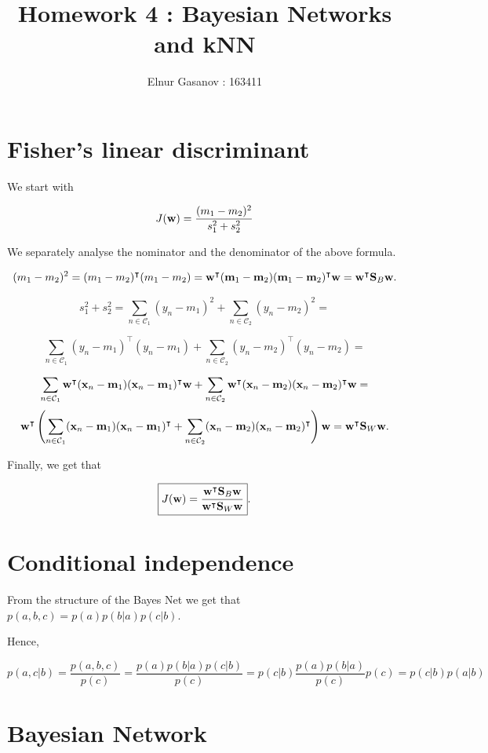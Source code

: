 \documentclass{article}
\title{Homework 4 : Bayesian Networks and kNN}
\author{Elnur Gasanov : 163411}
\newcommand{\mw}[0]{\bold{w}}
\newcommand{\mm}[0]{\bold{m}}
\newcommand{\mx}[0]{\bold{x}}
\newcommand{\mS}[0]{\bold{S}}
\begin{document}
\maketitle

\section{Fisher's linear discriminant}

We start with 

$$
J(\mw) = \frac{(m_1 - m_2)^2}{s_1^2 + s_2^2}
$$

We separately analyse the nominator and the denominator of the above formula.

$$
(m_1 - m_2)^2 = (m_1 - m_2)^\intercal (m_1 - m_2) = \mw^\intercal (\mm_1-\mm_2) (\mm_1 - \mm_2)^\intercal \mw = \mw^\intercal \mS_B \mw.
$$

$$
s_1^2 + s_2^2 = \sum\limits_{n\in \mathcal{C}_1} (y_n - m_1)^2 + \sum\limits_{n\in \mathcal{C}_2} (y_n - m_2)^2 = 
$$

$$
\sum\limits_{n\in \mathcal{C}_1} (y_n - m_1)^\intercal (y_n - m_1) + \sum\limits_{n\in \mathcal{C}_2} (y_n - m_2)^\intercal (y_n - m_2) = 
$$

$$
\sum\limits_{n\in \mathcal{C}_1} \mw^\intercal (\mx_n - \mm_1) (\mx_n - \mm_1)^\intercal \mw + \sum\limits_{n\in \mathcal{C}_2} \mw^\intercal (\mx_n - \mm_2) (\mx_n - \mm_2)^\intercal \mw = 
$$
$$
\mw^\intercal \left( \sum\limits_{n\in \mathcal{C}_1} (\mx_n - \mm_1) (\mx_n - \mm_1)^\intercal + \sum\limits_{n\in \mathcal{C}_2}(\mx_n - \mm_2) (\mx_n - \mm_2)^\intercal \right) \mw = \mw^\intercal \mS_W \mw.
$$

Finally, we get that

$$
\boxed{J(\mw) = \frac{\mw^\intercal \mS_B \mw}{\mw^\intercal \mS_W \mw}}.
$$

\section{Conditional independence}

From the structure of the Bayes Net we get that $p(a, b, c) = p(a) p(b|a) p(c|b)$.

Hence,

$$
p(a, c| b) = \frac{p(a, b, c)}{p(c)} = \frac{p(a) p(b|a) p(c|b)}{p(c)} = p(c|b) \frac{p(a) p(b|a)}{p(c)}{p(c)} = p(c|b) p(a|b)
$$

\section{Bayesian Network}
\end{document}

